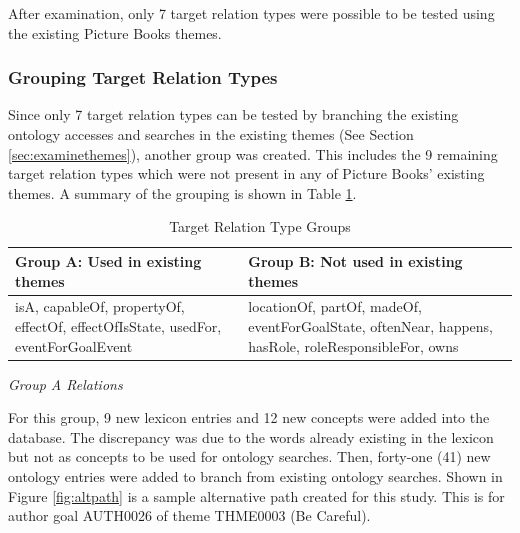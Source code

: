After examination, only 7 target relation types were possible to be tested using the existing Picture Books themes.

\subsubsection*{Grouping Target Relation Types}
\label{sec:grouprel}

Since only 7 target relation types can be tested by branching the existing ontology accesses and searches in the existing themes (See Section \ref{sec:examinethemes}), another group was created. This includes the 9 remaining target relation types which were not present in any of Picture Books' existing themes. A summary of the grouping is shown in Table \ref{tab:relgroups}.

\begin{table}[H]   %
\centering
\caption{Target Relation Type Groups} \vspace{0.25em}
\begin{tabular}{|p{5cm}|p{5cm}|} \hline
\textbf{Group A: Used in existing themes} & \textbf{Group B: Not used in existing themes} \\ \hline
isA, capableOf, propertyOf, effectOf, effectOfIsState, usedFor, eventForGoalEvent	& locationOf, partOf, madeOf, eventForGoalState, oftenNear, happens, hasRole, roleResponsibleFor, owns \\ \hline
\end{tabular}
\label{tab:relgroups}
\end{table}

\emph{Group A Relations}

For this group, 9 new lexicon entries and 12 new concepts were added into the database. The discrepancy was due to the words already existing in the lexicon but not as concepts to be used for ontology searches. Then, forty-one (41) new ontology entries were added to branch from existing ontology searches. Shown in Figure \ref{fig:altpath} is a sample alternative path created for this study. This is for author goal AUTH0026 of theme THME0003 (Be Careful).

